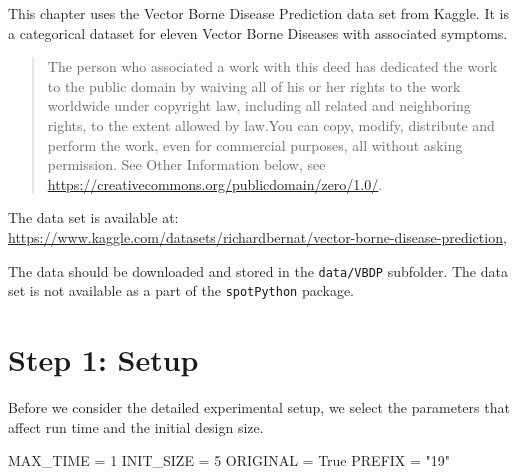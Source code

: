 \documentclass[
  letterpaper,
  DIV=11,
  numbers=noendperiod]{scrreprt}
\newenvironment{Shaded}{\begin{snugshade}}{\end{snugshade}}
\newcommand{\DecValTok}[1]{\textcolor[rgb]{0.68,0.00,0.00}{#1}}
\newcommand{\NormalTok}[1]{\textcolor[rgb]{0.00,0.23,0.31}{#1}}
\newcommand{\OperatorTok}[1]{\textcolor[rgb]{0.37,0.37,0.37}{#1}}
\newcommand{\StringTok}[1]{\textcolor[rgb]{0.13,0.47,0.30}{#1}}
\newcommand{\VariableTok}[1]{\textcolor[rgb]{0.07,0.07,0.07}{#1}}
\begin{document}
\begin{tcolorbox}[enhanced jigsaw, rightrule=.15mm, opacityback=0, colframe=quarto-callout-important-color-frame, opacitybacktitle=0.6, toptitle=1mm, arc=.35mm, colbacktitle=quarto-callout-important-color!10!white, coltitle=black, toprule=.15mm, leftrule=.75mm, titlerule=0mm, title=\textcolor{quarto-callout-important-color}{\faExclamation}\hspace{0.5em}{Vector Borne Disease Prediction Data Set}, bottomrule=.15mm, breakable, bottomtitle=1mm, left=2mm, colback=white]

This chapter uses the Vector Borne Disease Prediction data set from
Kaggle. It is a categorical dataset for eleven Vector Borne Diseases
with associated symptoms.

\begin{quote}
The person who associated a work with this deed has dedicated the work
to the public domain by waiving all of his or her rights to the work
worldwide under copyright law, including all related and neighboring
rights, to the extent allowed by law.You can copy, modify, distribute
and perform the work, even for commercial purposes, all without asking
permission. See Other Information below, see
\url{https://creativecommons.org/publicdomain/zero/1.0/}.
\end{quote}

The data set is available at:
\url{https://www.kaggle.com/datasets/richardbernat/vector-borne-disease-prediction},

The data should be downloaded and stored in the \texttt{data/VBDP}
subfolder. The data set is not available as a part of the
\texttt{spotPython} package.

\end{tcolorbox}

\hypertarget{sec-setup-19}{%
\section{Step 1: Setup}\label{sec-setup-19}}

Before we consider the detailed experimental setup, we select the
parameters that affect run time and the initial design size.

\begin{Shaded}
\begin{Highlighting}[]
\NormalTok{MAX\_TIME }\OperatorTok{=} \DecValTok{1}
\NormalTok{INIT\_SIZE }\OperatorTok{=} \DecValTok{5}
\NormalTok{ORIGINAL }\OperatorTok{=} \VariableTok{True}
\NormalTok{PREFIX }\OperatorTok{=} \StringTok{"19"}
\end{Highlighting}
\end{Shaded}
\end{document}
